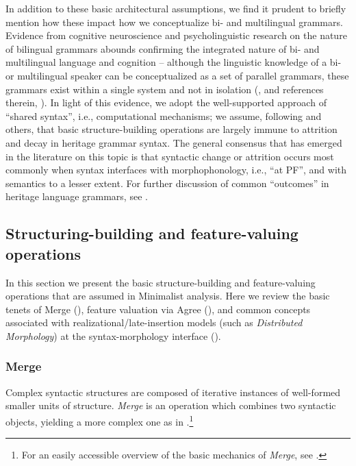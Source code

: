 \documentclass[output=paper,colorlinks,citecolor=brown]{langscibook}
\begin{document}
In addition to these basic architectural assumptions, we find it prudent to briefly mention how these impact how we conceptualize bi- and multilingual grammars. Evidence from cognitive neuroscience and psycholinguistic research on the nature of bilingual grammars abounds confirming the integrated nature of bi- and multilingual language and cognition -- although the linguistic knowledge of a bi- or multilingual speaker can be conceptualized as a set of parallel grammars, these grammars exist within a single system and not in isolation  (\citealt{green2013}, \citealt{putnam2018} and references therein, \citealt{aboh2015}). In light of this evidence, we adopt the well-supported approach of “shared syntax”, i.e., computational mechanisms; we assume, following \citet{lohndal2021} and others, that basic structure-building operations are largely immune to attrition and decay in heritage grammar syntax. The general consensus that has emerged in the literature on this topic is that syntactic change or attrition occurs most commonly when syntax interfaces with morphophonology, i.e., “at PF”, and with semantics to a lesser extent. For further discussion of common ``outcomes'' in heritage language grammars, see \citet{polinsky18}. 




\subsection{Structuring-building and feature-valuing operations}

In this section we present the basic structure-building and feature-valuing operations that are assumed in Minimalist analysis. Here we review the basic tenets of Merge (), feature valuation via Agree (), and common concepts associated with realizational/late-insertion models (such as \textit{Distributed Morphology}) at the syntax-morphology interface (). 



\subsubsection{Merge} \label{Merge-subsection}

Complex syntactic structures are composed of iterative instances of well-formed smaller units of structure. \emph{Merge} is an operation which combines two syntactic objects, yielding a more complex one as in .\footnote{For an easily accessible overview of the basic mechanics of \emph{Merge}, see \citet[Section 3.3]{adger03}.}
\end{document}
